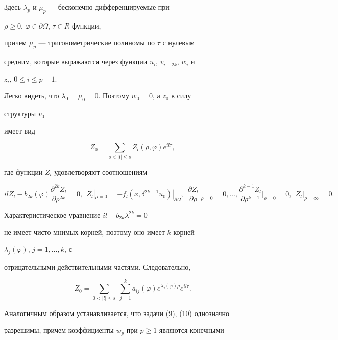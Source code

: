 Здесь $\lambda_p$ и $\mu_p$ --- бесконечно дифференцируемые при 


$\rho\ge0$, $\varphi\in\partial\Omega$, $\tau\in R$ функции,  


причем $\mu_p$ --- тригонометрические полиномы по $\tau$ с нулевым 


средним, которые выражаются через функции $u_i$, $v_{i-2k}$, $w_i$ и 


$z_i$, $0\le i\le p-1$. 


 


Легко видеть, что $\lambda_0=\mu_0=0$. Поэтому $w_0=0$, а $z_0$ в силу 


структуры $v_0$ 


имеет вид 


$$ 


Z_0=\sum_{o<|l|\le s}Z_l(\rho,\varphi)e^{i l\tau}, 


$$ 


где функции $Z_l$ удовлетворяют соотношениям 


$$ 


i l Z_l-b_{2k}(\varphi)\frac{\partial^{2k}Z_l} 


{\partial\rho^{2k}}=0,\ \ Z_l|_{\rho=0}=-f_l 


(x,\delta^{2k-1}u_0)|_{\partial\Omega},\ \


\frac{\partial Z_l}{\partial\rho}\bigg|_{\rho=0}=0,\dotsc, 


\frac{\partial^{k-1}Z_l}{\partial\rho^{k-1}}\bigg|_{\rho=0}=0, 


\ \ Z_l|_{\rho=\infty}=0. 


$$ 


Характеристическое уравнение $i l-b_{2k}\lambda^{2k}=0$ 


не имеет чисто мнимых корней, поэтому оно имеет $k$ корней 


$\lambda_j(\varphi)$, $j=1,\dotsc,k$, с 


отрицательными действительными частями. Следовательно, 


$$ 


Z_0=\sum_{0<|l|\le s}\;\sum^k_{j=1}a_{l j}(\varphi) 


e^{\lambda_j(\varphi)\rho}e^{i l \tau}. 


$$ 


 


Аналогичным образом устанавливается, что задачи (9), (10) однозначно  


разрешимы, причем коэффициенты $w_p$ при $p\ge1$ являются конечными 


